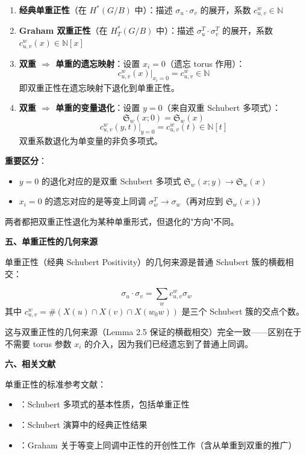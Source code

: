 \begin{enumerate}
\item \textbf{经典单重正性}（在 $H^*(G/B)$ 中）：描述 $\sigma_u \cdot \sigma_v$ 的展开，系数 $c_{u,v}^w \in \mathbb{N}$

\item \textbf{Graham 双重正性}（在 $H_T^*(G/B)$ 中）：描述 $\sigma_u^T \cdot \sigma_v^T$ 的展开，系数 $c_{u,v}^w(x) \in \mathbb{N}[x]$

\item \textbf{双重 $\Rightarrow$ 单重的遗忘映射}：设置 $x_i = 0$（遗忘 torus 作用）：
$$c_{u,v}^w(x)|_{x_i=0} = c_{u,v}^w \in \mathbb{N}$$
即双重正性在遗忘映射下退化到单重正性。

\item \textbf{双重 $\Rightarrow$ 单重的变量退化}：设置 $y = 0$（来自双重 Schubert 多项式）：
$$\mathfrak{S}_w(x; 0) = \mathfrak{S}_w(x)$$
$$c_{u,v}^w(y, t)|_{y=0} = c_{u,v}^w(t) \in \mathbb{N}[t]$$
双重系数退化为单变量的非负多项式。
\end{enumerate}

\textbf{重要区分}：
\begin{itemize}
\item $y = 0$ 的退化对应的是双重 Schubert 多项式 $\mathfrak{S}_w(x; y) \to \mathfrak{S}_w(x)$
\item $x_i = 0$ 的遗忘对应的是等变上同调 $\sigma_w^T \to \sigma_w$（再对应到 $\mathfrak{S}_w(x)$）
\end{itemize}

两者都把双重正性退化为某种单重形式，但退化的"方向"不同。

\textbf{五、单重正性的几何来源}

单重正性（经典 Schubert Positivity）的几何来源是普通 Schubert 簇的横截相交：

$$\sigma_u \cdot \sigma_v = \sum_w c_{u,v}^w \sigma_w$$
其中 $c_{u,v}^w = \#\left(X(u) \cap X(v) \cap X(w_0 w)\right)$ 是三个 Schubert 簇的交点个数。

这与双重正性的几何来源（Lemma 2.5 保证的横截相交）完全一致——区别在于不需要 torus 参数 $x_i$ 的介入，因为我们已经遗忘到了普通上同调。

\textbf{六、相关文献}

单重正性的标准参考文献：
\begin{itemize}
\item \cite[Chapter 1]{macdonald1991}：Schubert 多项式的基本性质，包括单重正性
\item \cite[Chapter 10]{FultonQuntum1997}：Schubert 演算中的经典正性结果
\item \cite[Chapter 3]{Gr}：Graham 关于等变上同调中正性的开创性工作（含从单重到双重的推广）
\end{itemize}

